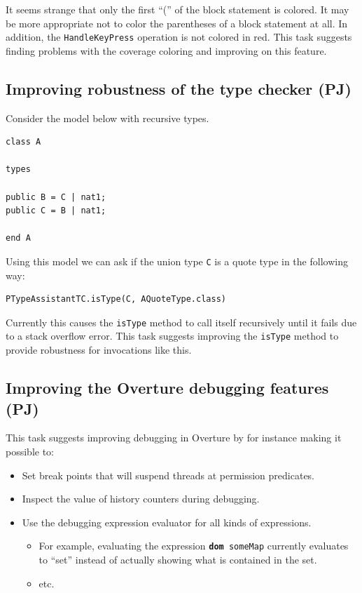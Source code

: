 \documentclass[11pt]{report}
\begin{document}
It seems strange that only the first ``('' of the block statement is colored. It may be more appropriate not to color the parentheses of a block statement at all. In addition, the \texttt{HandleKeyPress} operation is not colored in red. This task suggests finding problems with the coverage coloring and improving on this feature.

\newpage

\subsection*{Improving robustness of the type checker (PJ)}

Consider the model below with recursive types.

\begin{lstlisting}
class A
 
types
 
public B = C | nat1; 
public C = B | nat1; 
 
end A
\end{lstlisting}

Using this model we can ask if the union type \texttt{C} is a quote type in the following way:

\begin{lstlisting}
PTypeAssistantTC.isType(C, AQuoteType.class)
\end{lstlisting}

Currently this causes the \texttt{isType} method to call itself recursively until it fails due to a stack overflow error. This task suggests improving the \texttt{isType} method to provide robustness for invocations like this.

\subsection*{Improving the Overture debugging features (PJ)}

This task suggests improving debugging in Overture by for instance making it possible to:

\begin{itemize}
\item Set break points that will suspend threads at permission predicates.
\item Inspect the value of history counters during debugging.
\item Use the debugging expression evaluator for all kinds of expressions.
\begin{itemize}
\item For example, evaluating the expression \texttt{\textbf{dom} someMap} currently evaluates to ``set'' instead of actually showing what is contained in the set.
\item etc.
\end{itemize}
\end{itemize}
\end{document}
